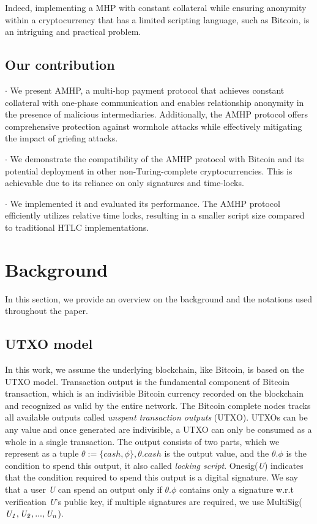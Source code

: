 \documentclass[conference]{IEEEtran}
\begin{document}
Indeed, implementing a MHP with constant collateral while ensuring anonymity within a cryptocurrency that has a limited scripting language, 
such as Bitcoin, is an intriguing and practical problem.

\subsection{Our contribution}
$\cdot$ We present AMHP, a multi-hop payment protocol that achieves constant collateral with one-phase communication and enables 
relationship anonymity in the presence of malicious intermediaries. Additionally, the AMHP protocol offers comprehensive protection 
against wormhole attacks while effectively mitigating the impact of griefing attacks. 

$\cdot$ We demonstrate the compatibility of the AMHP protocol with Bitcoin and its potential deployment in other non-Turing-complete 
cryptocurrencies. This is achievable due to its reliance on only signatures and time-locks.

$\cdot$ We implemented it and evaluated its performance. The AMHP protocol efficiently utilizes relative time locks, 
resulting in a smaller script size compared to traditional HTLC implementations.



\section{Background}
In this section, we provide an overview on the background and the notations used throughout the paper.

\subsection{UTXO model}
In this work, we assume the underlying blockchain, like Bitcoin, is based on the UTXO model. Transaction output is 
the fundamental component of Bitcoin transaction, which is an indivisible Bitcoin currency recorded on the blockchain 
and recognized as valid by the entire network. The Bitcoin complete nodes tracks all available outputs called 
\emph{unspent transaction outputs} (UTXO). UTXOs can be any value and once generated are indivisible, a UTXO can only 
be consumed as a whole in a single transaction. The output consists of two parts, which we represent as a 
tuple $\theta :=\{cash,\phi\}, \theta.cash$ is the output value, and the $\theta.\phi$ is the condition to spend 
this output, it also called \emph{locking script}. Onesig(\emph{U}) indicates that the condition required to 
spend this output is a digital signature. We say that a user \emph{U} can spend an output only if $\theta.\phi$ 
contains only a signature w.r.t verification  \emph{U}'s public key, if multiple signatures are required, we use 
MultiSig($\it U_1,U_2,...,U_n$).
\end{document}
